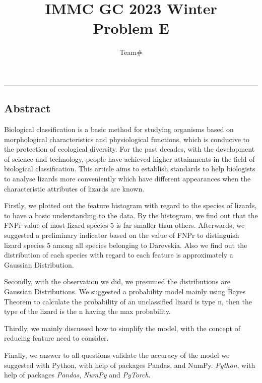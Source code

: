 \documentclass[12pt]{article}
\title{IMMC GC 2023 Winter\\ Problem E}
\author{Team\#\Team}
\begin{document}
\maketitle
\begin{center}
\rule{13cm}{0.4pt}
\end{center}
\thispagestyle{empty}

\begin{center}
\section*{Abstract}
\end{center}

Biological classification is a basic method for studying organisms based on morphological characteristics and physiological functions, which is conducive to the protection of ecological diversity.  For the past decades, with the development of science and technology, people have achieved higher attainments in the field of biological classification. This article aims to establish standards to help biologists to analyse lizards more conveniently which have different appearances when the characteristic attributes of lizards are known.

Firstly, we plotted out the feature histogram with regard to the
species of lizards, to have a basic understanding to the data.
By the histogram, we find out that the FNPr value of most
lizard species 5 is far smaller than others. Afterwards, we suggested
a preliminary indicator based on the value of FNPr to distinguish
lizard species 5 among all species belonging to Darevskia. Also we
find out the distribution of each species with regard to each feature
is approximately a Gaussian Distribution.

Secondly, with the observation we did, we presumed the distributions
are Gaussian Distributions. We suggested a probability model mainly
using Bayes Theorem to calculate the probability of an unclassified
lizard is type n, then the type of the lizard is the n having the max
probability.

Thirdly, we mainly discussed how to simplify the model, with the concept of reducing feature need to consider.

Finally, we answer to all questions validate the accuracy of the model we suggested with Python, with help of packages Pandas, and NumPy.
\textit{Python}, with help of packages \textit{Pandas},
\textit{NumPy} and \textit{PyTorch}.

\newpage
\thispagestyle{empty}
\end{document}
